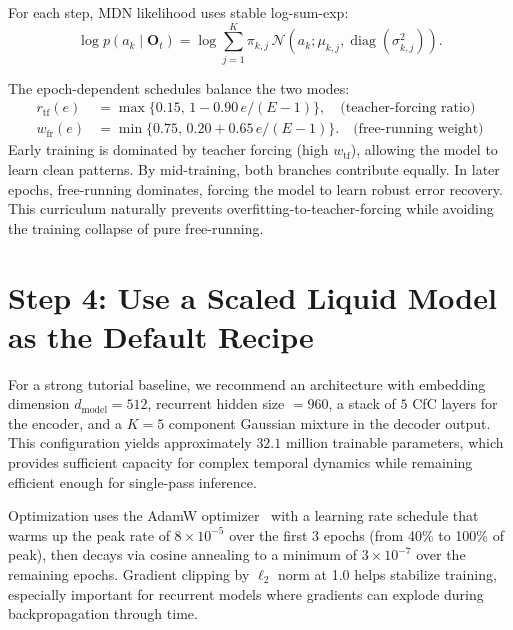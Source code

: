 \documentclass{article}
\begin{document}
For each step, MDN likelihood uses stable log-sum-exp:
\begin{equation}
\log p(a_k\mid\mathbf{O}_t)=\log\sum_{j=1}^{K}\pi_{k,j}\,\mathcal{N}\!\left(a_k;\mu_{k,j},\operatorname{diag}(\sigma^2_{k,j})\right).
\end{equation}

The epoch-dependent schedules balance the two modes:
\begin{align}
r_{\mathrm{tf}}(e) &= \max\{0.15,\,1-0.90\,e/(E-1)\}, \quad \text{(teacher-forcing ratio)} \\
w_{\mathrm{fr}}(e) &= \min\{0.75,\,0.20+0.65\,e/(E-1)\}. \quad \text{(free-running weight)}
\end{align}
Early training is dominated by teacher forcing (high $w_{\mathrm{tf}}$), allowing the model to learn clean patterns. By mid-training, both branches contribute equally. In later epochs, free-running dominates, forcing the model to learn robust error recovery. This curriculum naturally prevents overfitting-to-teacher-forcing while avoiding the training collapse of pure free-running.

\section{Step 4: Use a Scaled Liquid Model as the Default Recipe}
For a strong tutorial baseline, we recommend an architecture with embedding dimension $d_{\mathrm{model}}=512$, recurrent hidden size $=960$, a stack of $5$ CfC layers for the encoder, and a $K=5$ component Gaussian mixture in the decoder output. This configuration yields approximately $32.1$ million trainable parameters, which provides sufficient capacity for complex temporal dynamics while remaining efficient enough for single-pass inference.

Optimization uses the AdamW optimizer~\cite{loshchilov2019adamw} with a learning rate schedule that warms up the peak rate of $8\times10^{-5}$ over the first 3 epochs (from 40\% to 100\% of peak), then decays via cosine annealing to a minimum of $3\times10^{-7}$ over the remaining epochs. Gradient clipping by $\ell_2$ norm at 1.0 helps stabilize training, especially important for recurrent models where gradients can explode during backpropagation through time.
\end{document}

